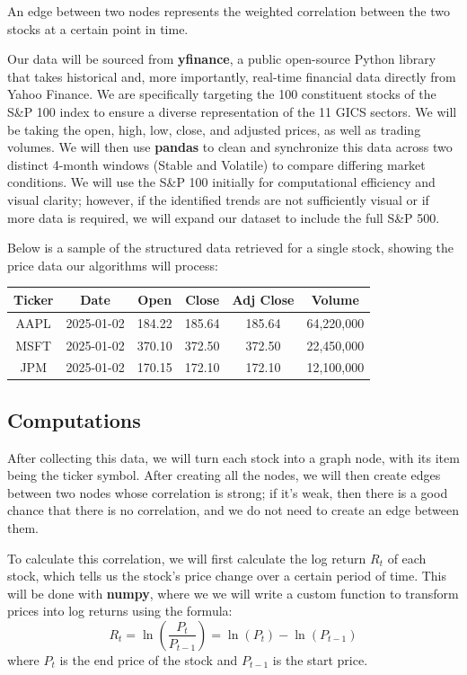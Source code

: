 \documentclass[fontsize=11pt]{article}
\begin{document}
An edge between two nodes represents the weighted correlation between the two stocks at a certain point in time.

Our data will be sourced from \textbf{yfinance}, a public open-source Python library that takes historical and, more importantly, real-time financial data directly from Yahoo Finance. We are specifically targeting the 100 constituent stocks of the S\&P 100 index to ensure a diverse representation of the 11 GICS sectors. We will be taking the open, high, low, close, and adjusted prices, as well as trading volumes. We will then use \textbf{pandas} to clean and synchronize this data across two distinct 4-month windows (Stable and Volatile) to compare differing market conditions. We will use the S\&P 100 initially for computational efficiency and visual clarity; however, if the identified trends are not sufficiently visual or if more data is required, we will expand our dataset to include the full S\&P 500.

\vspace{1em}
\noindent Below is a sample of the structured data retrieved for a single stock, showing the price data our algorithms will process:

\begin{center}
\begin{tabular}{|c|c|c|c|c|c|}
\hline
\textbf{Ticker} & \textbf{Date} & \textbf{Open} & \textbf{Close} & \textbf{Adj Close} & \textbf{Volume} \\ \hline
AAPL & 2025-01-02 & 184.22 & 185.64 & 185.64 & 64,220,000 \\ \hline
MSFT & 2025-01-02 & 370.10 & 372.50 & 372.50 & 22,450,000 \\ \hline
JPM  & 2025-01-02 & 170.15 & 172.10 & 172.10 & 12,100,000 \\ \hline
\end{tabular}
\end{center}

\subsection*{Computations}
After collecting this data, we will turn each stock into a graph node, with its item being the ticker symbol. After creating all the nodes, we will then create edges between two nodes whose correlation is strong; if it's weak, then there is a good chance that there is no correlation, and we do not need to create an edge between them.

To calculate this correlation, we will first calculate the log return $R_t$ of each stock, which tells us the stock's price change over a certain period of time. This will be done with \textbf{numpy}, where we we will write a custom function to transform prices into log returns using the formula:
\[ R_t = \ln\left(\frac{P_t}{P_{t-1}}\right) = \ln(P_t) - \ln(P_{t-1}) \]
where $P_t$ is the end price of the stock and $P_{t-1}$ is the start price.
\end{document}
